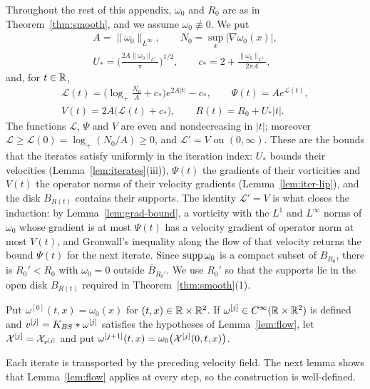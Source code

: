 Throughout the rest of this appendix, $\omega_0$ and $R_0$ are as in
Theorem~\ref{thm:smooth}, and we assume $\omega_0\not\equiv0$. We put
\begin{gather*}
A=\|\omega_0\|_{L^\infty},\qquad
N_0=\sup_x|\nabla\omega_0(x)|,\\
U_*=\Big(\frac{2A\|\omega_0\|_{L^1}}{\pi}\Big)^{1/2},\qquad
c_*=2+\frac{\|\omega_0\|_{L^1}}{2\pi A},
\end{gather*}
and, for $t\in\mathbb{R}$,
\begin{gather*}
\mathcal L(t)=\Big(\log_+\frac{N_0}{A}+c_*\Big)e^{2A|t|}-c_*,\qquad
\Psi(t)=Ae^{\mathcal L(t)},\\
V(t)=2A\big(\mathcal L(t)+c_*\big),\qquad R(t)=R_0+U_*|t| .
\end{gather*}
The functions $\mathcal L$, $\Psi$ and $V$ are even and nondecreasing in
$|t|$; moreover $\mathcal L\ge\mathcal L(0)=\log_+(N_0/A)\ge0$, and
$\mathcal L'=V$ on $(0,\infty)$. These are the bounds that the iterates satisfy
uniformly in the iteration index: $U_*$ bounds their velocities
(Lemma~\ref{lem:iterates}(iii)), $\Psi(t)$ the gradients of their vorticities
and $V(t)$ the operator norms of their velocity gradients
(Lemma~\ref{lem:iter-lip}), and the disk $B_{R(t)}$ contains their supports. The
identity $\mathcal L'=V$ is what closes the induction: by
Lemma~\ref{lem:grad-bound}, a vorticity with the $L^1$ and $L^\infty$ norms of
$\omega_0$ whose gradient is at most $\Psi(t)$ has a velocity gradient of operator norm at most
$V(t)$, and Gronwall's inequality along the flow of that velocity returns the
bound $\Psi(t)$ for the next iterate. Since $\operatorname{supp}\omega_0$ is a compact subset of
$B_{R_0}$, there is
$R_0'<R_0$ with $\omega_0=0$ outside $\overline B_{R_0'}$. We use $R_0'$ so
that the supports lie in the open disk $B_{R(t)}$ required in
Theorem~\ref{thm:smooth}(1).

\begin{definition}
\label{def:iterates}
Put $\omega^{[0]}(t,x)=\omega_0(x)$ for $(t,x)\in\mathbb{R}\times\mathbb{R}^2$. If
$\omega^{[j]}\in C^\infty(\mathbb{R}\times\mathbb{R}^2)$ is defined and
$v^{[j]}=K_{BS}\ast\omega^{[j]}$ satisfies the hypotheses of Lemma~\ref{lem:flow},
let $\mathcal{X}^{[j]}=\mathcal{X}_{v^{[j]}}$ and put
$\omega^{[j+1]}(t,x)=\omega_0\big(\mathcal{X}^{[j]}(0,t,x)\big)$.
\end{definition}

Each iterate is transported by the preceding velocity field. The next lemma
shows that Lemma~\ref{lem:flow} applies at every step, so the construction is
well-defined.

